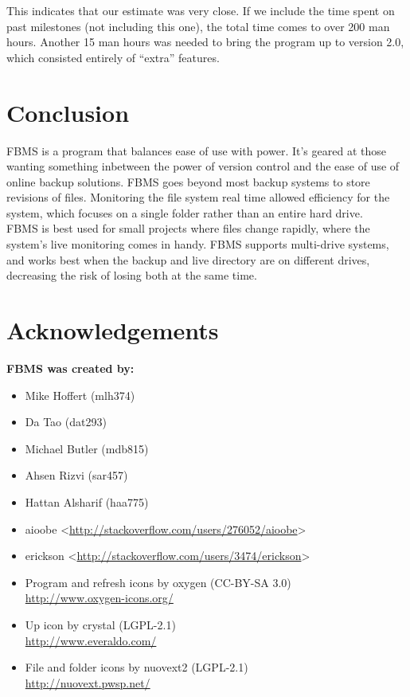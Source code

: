 \documentclass[12pt,a4paper]{article}
\newcommand\todonote[1]{\noindent{\color{red}\fbox{\parbox{\dimexpr\linewidth-2\fboxsep-2\fboxrule}{\textit\large{\textbf{TODO: #1}}}}}}
\begin{document}
This indicates that our estimate was very close. If we include the time spent on past milestones (not including this one), the total time comes to over 200 man hours. Another 15 man hours was needed to bring the program up to version 2.0, which consisted entirely of ``extra'' features. 

\todonote{Fill me out, yo!}

\section{Conclusion}
FBMS is a program that balances ease of use with power. It's geared at those wanting something inbetween the power of version control and the ease of use of online backup solutions. FBMS goes beyond most backup systems to store revisions of files. Monitoring the file system real time allowed efficiency for the system, which focuses on a single folder rather than an entire hard drive. \\

FBMS is best used for small projects where files change rapidly, where the system's live monitoring comes in handy. FBMS supports multi-drive systems, and works best when the backup and live directory are on different drives, decreasing the risk of losing both at the same time. 

\section{Acknowledgements}
\textbf{FBMS was created by:}
\begin{itemize}
\item Mike Hoffert (mlh374)
\item Da Tao (dat293)
\item Michael Butler (mdb815)
\item Ahsen Rizvi (sar457)
\item Hattan Alsharif (haa775)
\end{itemize}

\begin{itemize}
\item aioobe <\url{http://stackoverflow.com/users/276052/aioobe}>
\item erickson <\url{http://stackoverflow.com/users/3474/erickson}>
\end{itemize}

\begin{itemize}
\item Program and refresh icons by oxygen (CC-BY-SA 3.0) \\
\url{http://www.oxygen-icons.org/}
\item Up icon by crystal (LGPL-2.1) \\
\url{http://www.everaldo.com/}
\item File and folder icons by nuovext2 (LGPL-2.1) \\
\url{http://nuovext.pwsp.net/}
\end{itemize}
\end{document}
